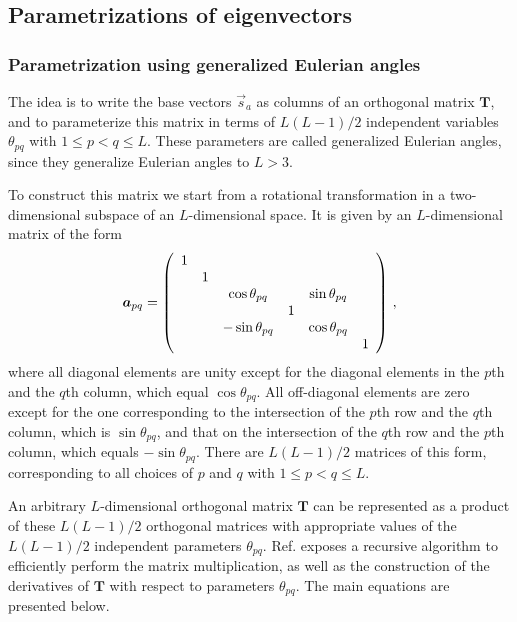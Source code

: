 \documentclass[preprint,amsmath,amssymb,superscriptaddress,showpacs,pre]{revtex4-1}
\let\originalleft\left
\let\originalright\right
\renewcommand{\left}{\mathopen{}\mathclose\bgroup\originalleft}
\renewcommand{\right}{\aftergroup\egroup\originalright}
\begin{document}
\subsection{Parametrizations of  eigenvectors } %
\label{sub:parametrizations_of_eigenvectors}
\subsubsection{Parametrization using generalized Eulerian angles}
The idea is to write the base vectors $\vec{s}_a$ as columns of an orthogonal matrix $\bm{T}$, and to parameterize this matrix in terms of $L(L-1)/2$ independent variables  $\theta_ {pq}$ with $1 \leq p <q \leq L $. These parameters are called generalized Eulerian angles, since they generalize Eulerian angles to $L>3$. 

To construct this matrix we start from a rotational transformation in a two-dimensional subspace of an $L$-dimensional space. It is given by an $L$-dimensional matrix of the form
\begin{equation} 
\bm a_{pq} =  \left(
\begin{array}{cccccc}
1 &   &  &  &  &\\
 & 1& & & & \\
& & \cos\theta_{pq} & & \sin\theta_{pq}\\
& &  & 1 & &\\
& &  -\sin\theta_{pq}& & \cos\theta_{pq} &\\
& &  & &  & 1\\
\end{array}
\right) \ ,
\label{EP_eq:1}
\end{equation}
where all diagonal elements are unity except for the diagonal elements in the $p$th and the $q$th column, which equal $\cos\theta_{pq}$. All off-diagonal elements are zero except for the one corresponding to the intersection of the $p$th row and the $q$th column, which is $\sin\theta_{pq}$, and that on the intersection of the $q$th row and the $p$th column, which equals $-\sin\theta_{pq}$. There are $L(L - 1)/2$  matrices of this form, corresponding to all choices of $p$ and $q$ with $1\leq p <q\leq L$. 

An arbitrary $L$-dimensional orthogonal matrix $\bm T$ can be represented as a product of these $L(L-1)/2$ orthogonal matrices with appropriate values of the $L(L-1)/2$ independent parameters $\theta_{pq}$. Ref. \cite{Raffenetti1970GEA} exposes a recursive algorithm to efficiently perform the matrix multiplication, as well as the construction of the derivatives of $\bm T$ with respect to parameters $\theta_{pq}$. The main equations are presented below.
\end{document}
